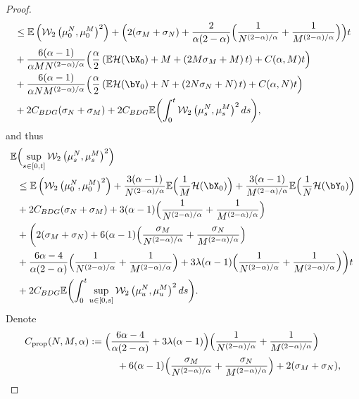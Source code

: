 \begin{proof}
\begin{align*}
&\leq \mathbb{E}\left(\mathcal{W}_2\left(\mu_0^N,\mu_0^M\right)^2\right)+\Bigl(2(\sigma_M+\sigma_N)+\frac{2}{\alpha(2-\alpha)}\Bigl(\frac{1}{N^{(2-\alpha)/\alpha}}+\frac{1}{M^{(2-\alpha)/\alpha}}\Bigr)\Bigr)t\\
&+\frac{6(\alpha-1)}{\alpha MN^{(2-\alpha)/\alpha}}\Bigl(\frac{\alpha}{2}\left(\mathbb{E}\mathcal{H}(\bX_0)+M+\left(2M\sigma_M+M\right)t\right)+C(\alpha,M)t\Bigr)\\
&+\frac{6(\alpha-1)}{\alpha NM^{(2-\alpha)/\alpha}}\Bigl(\frac{\alpha}{2}\left(\mathbb{E}\mathcal{H}(\bY_0)+N+\left(2N\sigma_N+N\right)t\right)+C(\alpha,N)t\Bigr)\\
&+2C_{BDG}(\sigma_N+\sigma_M)+2C_{BDG}\mathbb{E}\biggl(\int_0^t\mathcal{W}_2\left(\mu_s^N,\mu_s^M\right)^2ds\biggr),
\end{align*}
and thus\vspace*{-3pt}
\begin{align*}
\mathbb{E}&\Bigl(\sup_{s\in[0,t]}\mathcal{W}_2\left(\mu_s^N,\mu_s^M\right)^2\Bigr)\\
&\leq \mathbb{E}\left(\mathcal{W}_2\left(\mu_0^N,\mu_0^M\right)^2\right)+\frac{3(\alpha-1)}{ N^{(2-\alpha)/\alpha}}\mathbb{E}\Bigl(\frac{1}{M}\mathcal{H}(\bX_0)\Bigr)+\frac{3(\alpha-1)}{M^{(2-\alpha)/\alpha}}\mathbb{E}\Bigl(\frac{1}{N}\mathcal{H}(\bY_0)\Bigr)\\
&+2C_{BDG}(\sigma_N+\sigma_M)+3(\alpha-1)\Bigl(\frac{1}{N^{(2-\alpha)/\alpha}}+\frac{1}{M^{(2-\alpha)/\alpha}}\Bigr)\\
&+\biggl(2(\sigma_M+\sigma_N)+6(\alpha-1)\Bigl(\frac{\sigma_M}{N^{(2-\alpha)/\alpha}}+\frac{\sigma_N}{M^{(2-\alpha)/\alpha}}\Bigr)\\
&+\frac{6\alpha-4}{\alpha(2-\alpha)}\Bigl(\frac{1}{N^{(2-\alpha)/\alpha}}+\frac{1}{M^{(2-\alpha)/\alpha}}\Bigr)+3\lambda(\alpha-1)\Bigl(\frac{1}{N^{(2-\alpha)/\alpha}}+\frac{1}{M^{(2-\alpha)/\alpha}}\Bigr)\biggr)t\\
&+2C_{BDG}\mathbb{E}\biggl(\int_0^t\sup_{u\in[0,s]}\mathcal{W}_2\left(\mu_u^N,\mu_u^M\right)^2ds\biggr).
\end{align*}
Denote
\begin{align*}
C_{\text{prop}}(N,M,\alpha)&:=\Bigl(\frac{6\alpha-4}{\alpha(2-\alpha)}+3\lambda(\alpha-1)\Bigr)\Bigl(\frac{1}{N^{(2-\alpha)/\alpha}}+\frac{1}{M^{(2-\alpha)/\alpha}}\Bigr)\\
&\hspace*{1cm}+6(\alpha-1)\Bigl(\frac{\sigma_M}{N^{(2-\alpha)/\alpha}}+\frac{\sigma_N}{M^{(2-\alpha)/\alpha}}\Bigr)+2(\sigma_M+\sigma_N),\\

\end{align*}
\end{proof}
